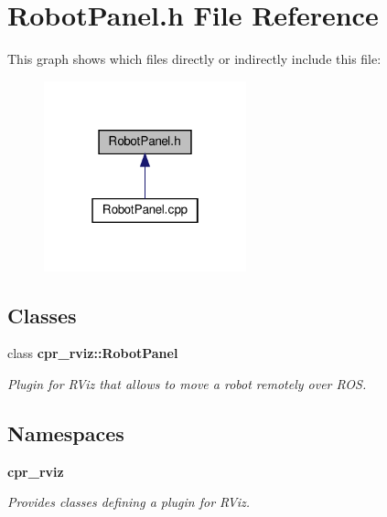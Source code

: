 \section{Robot\+Panel.\+h File Reference}
\label{RobotPanel_8h}
This graph shows which files directly or indirectly include this file\+:
\nopagebreak
\begin{figure}[H]
\begin{center}
\leavevmode
\includegraphics[width=166pt]{RobotPanel_8h__dep__incl}
\end{center}
\end{figure}
\subsection*{Classes}
\begin{DoxyCompactItemize}
\item 
class \textbf{ cpr\+\_\+rviz\+::\+Robot\+Panel}
\begin{DoxyCompactList}\small\item\em Plugin for R\+Viz that allows to move a robot remotely over R\+OS. \end{DoxyCompactList}\end{DoxyCompactItemize}
\subsection*{Namespaces}
\begin{DoxyCompactItemize}
\item 
 \textbf{ cpr\+\_\+rviz}
\begin{DoxyCompactList}\small\item\em Provides classes defining a plugin for R\+Viz. \end{DoxyCompactList}\end{DoxyCompactItemize}
